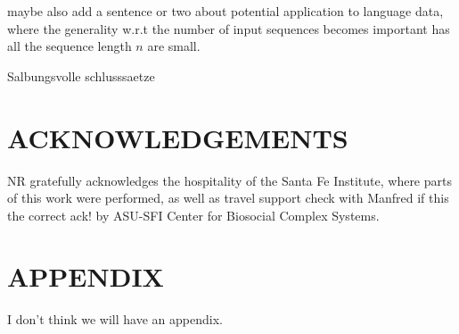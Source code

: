 \documentclass[a4paper,10pt]{article}
\newcommand{\TODO}[1]{\begingroup\color{red}#1\endgroup}
\begin{document}
\TODO{maybe also add a sentence or two about potential application to
  language data, where the generality w.r.t the number of input sequences
  becomes important has all the sequence length $n$ are small.}

\TODO{Salbungsvolle schlusssaetze}

\section*{\uppercase{Acknowledgements}}

NR gratefully acknowledges the hospitality of the Santa Fe Institute, where
parts of this work were performed, as well as travel support \TODO{check
  with Manfred if this the correct ack! by ASU-SFI
  Center for Biosocial Complex Systems.}

\vfill

{\small
}

\section*{\uppercase{Appendix}}

\TODO{I don't think we will have an appendix.} 


\vfill
\end{document}

